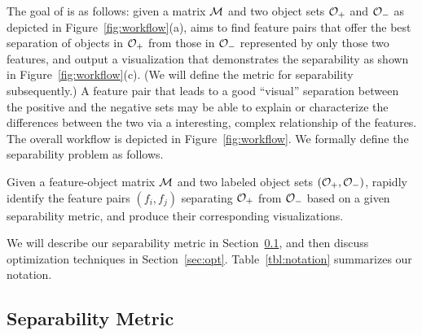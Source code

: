 The goal of \genviz is as follows: given a matrix $\mm$ and two object sets $\oo_+$ and $\oo_-$ as depicted in Figure~\ref{fig:workflow}(a), \genviz aims to find feature pairs that offer the best separation of objects in $\oo_+$ from those in $\oo_-$ represented by only those two features, and output a visualization that demonstrates the separability as shown in Figure~\ref{fig:workflow}(c). (We will define the metric for separability subsequently.) A feature pair that leads to a good ``visual'' separation between the positive and the negative sets may be able to explain or characterize the differences between the two via a interesting, complex relationship of the features. The overall workflow is depicted in Figure~\ref{fig:workflow}. 
We formally define the separability problem as follows.
\begin{formulation}[Separability]\label{prob:separability}
Given a feature-object matrix $\mm$ and two labeled object sets $(\oo_+,\oo_-)$, rapidly identify the \topk feature pairs $(f_i,f_j)$ separating $\oo_+$ from $\oo_-$ based on a given separability metric, and produce their corresponding {visualizations}.
\end{formulation}
\noindent %
We will describe our separability metric in Section~\ref{sec:metric}, and then discuss optimization techniques in Section~\ref{sec:opt}. Table~\ref{tbl:notation} summarizes our notation.



\subsection{Separability Metric}\label{sec:metric}

